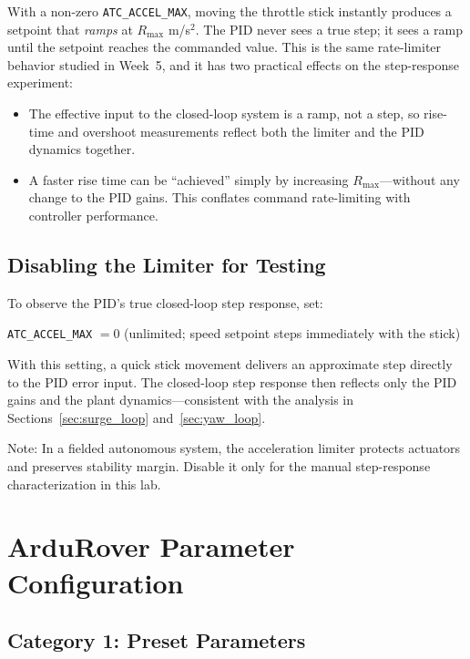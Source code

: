 \documentclass[../../book.tex]{subfiles}
\begin{document}
With a non-zero \texttt{ATC\_ACCEL\_MAX}, moving the throttle stick instantly produces a setpoint that \emph{ramps} at $R_{\max}$ m/s$^2$.  The PID never sees a true step; it sees a ramp until the setpoint reaches the commanded value.  This is the same rate-limiter behavior studied in Week~5, and it has two practical effects on the step-response experiment:

\begin{itemize}
  \item The effective input to the closed-loop system is a ramp, not a step, so rise-time and overshoot measurements reflect both the limiter and the PID dynamics together.
  \item A faster rise time can be ``achieved'' simply by increasing $R_{\max}$---without any change to the PID gains.  This conflates command rate-limiting with controller performance.
\end{itemize}

\subsection{Disabling the Limiter for Testing}

To observe the PID's true closed-loop step response, set:

\begin{center}
  \texttt{ATC\_ACCEL\_MAX} $= 0$ \quad (unlimited; speed setpoint steps immediately with the stick)
\end{center}

With this setting, a quick stick movement delivers an approximate step directly to the PID error input.  The closed-loop step response then reflects only the PID gains and the plant dynamics---consistent with the analysis in Sections~\ref{sec:surge_loop} and~\ref{sec:yaw_loop}.

Note: In a fielded autonomous system, the acceleration limiter protects actuators and preserves stability margin.  Disable it only for the manual step-response characterization in this lab.

\section{ArduRover Parameter Configuration}
\label{sec:params}

\subsection{Category 1: Preset Parameters}
\end{document}

